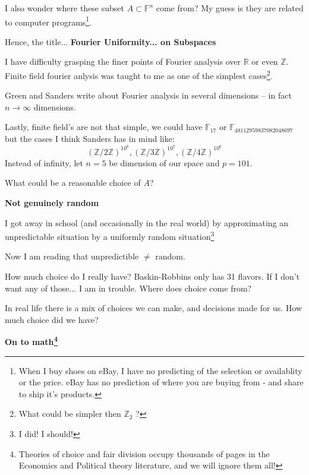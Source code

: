 \documentclass[12pt]{article}
\begin{document}
I also wonder where these subset $A \subset \mathbb{F}^n$ come from?  My guess is they are related to computer programs\footnote{When I buy shoes on eBay, I have no predicting of the selection or availablity or the price.  eBay has no prediction of where you are buying from - and share to ship it's products.}.  
\newpage

Hence, the title... \textbf{Fourier Uniformity... on Subspaces} \newline

I have difficulty grasping the finer points of Fourier analysis over $\mathbb{R}$ or even $\mathbb{Z}$.  Finite field fourier anlysis was taught to me as one of the simplest cases\footnote{What could be simpler then $\mathbb{Z}_2$ ? }.   \newline

Green and Sanders write about Fourier analysis in several dimensions -- in fact $n \to \infty$ dimensions.  \newline 

Lastly, finite field's are not that simple, we could have $\mathbb{F}_{17}$ or $\mathbb{F}_{48112959837082048697}$ but the cases I think Sanders has in mind like:
$$ (\mathbb{Z} / 2\mathbb{Z})^{10^8},
(\mathbb{Z} / 3\mathbb{Z})^{10^7},
(\mathbb{Z} / 4\mathbb{Z})^{10^6} $$
Instead of infinity, let $n = 5$ be dimension of our space and $p = 101$. \newline

What could be a reasonable choice of $A$?

\newpage

\textbf{Not genuinely random} \newline

I got away in school (and occasionally in the real world) by approximating an unpredictable situation by a uniformly random situation\footnote{I did! I should!} \newline

Now I am reading that unpredictible $\neq$ random.  \newline

How much choice do I really have?  Baskin-Robbins only has 31 flavors.  If I don't want any of those... I am in trouble.  Where does choice come from? \newline

In real life there is a mix of choices we can make, and decisions made for us.  How much choice did we have? 

\newpage

\textbf{On to math\footnote{Theories of choice and fair division occupy thousands of pages in the Economics and Political theory literature, and we will ignore them all! }} \newline
\end{document}

